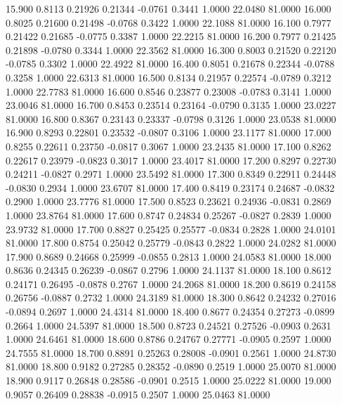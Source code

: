   15.900   0.8113   0.21926   0.21344  -0.0761   0.3441   1.0000  22.0480  81.0000
  16.000   0.8025   0.21600   0.21498  -0.0768   0.3422   1.0000  22.1088  81.0000
  16.100   0.7977   0.21422   0.21685  -0.0775   0.3387   1.0000  22.2215  81.0000
  16.200   0.7977   0.21425   0.21898  -0.0780   0.3344   1.0000  22.3562  81.0000
  16.300   0.8003   0.21520   0.22120  -0.0785   0.3302   1.0000  22.4922  81.0000
  16.400   0.8051   0.21678   0.22344  -0.0788   0.3258   1.0000  22.6313  81.0000
  16.500   0.8134   0.21957   0.22574  -0.0789   0.3212   1.0000  22.7783  81.0000
  16.600   0.8546   0.23877   0.23008  -0.0783   0.3141   1.0000  23.0046  81.0000
  16.700   0.8453   0.23514   0.23164  -0.0790   0.3135   1.0000  23.0227  81.0000
  16.800   0.8367   0.23143   0.23337  -0.0798   0.3126   1.0000  23.0538  81.0000
  16.900   0.8293   0.22801   0.23532  -0.0807   0.3106   1.0000  23.1177  81.0000
  17.000   0.8255   0.22611   0.23750  -0.0817   0.3067   1.0000  23.2435  81.0000
  17.100   0.8262   0.22617   0.23979  -0.0823   0.3017   1.0000  23.4017  81.0000
  17.200   0.8297   0.22730   0.24211  -0.0827   0.2971   1.0000  23.5492  81.0000
  17.300   0.8349   0.22911   0.24448  -0.0830   0.2934   1.0000  23.6707  81.0000
  17.400   0.8419   0.23174   0.24687  -0.0832   0.2900   1.0000  23.7776  81.0000
  17.500   0.8523   0.23621   0.24936  -0.0831   0.2869   1.0000  23.8764  81.0000
  17.600   0.8747   0.24834   0.25267  -0.0827   0.2839   1.0000  23.9732  81.0000
  17.700   0.8827   0.25425   0.25577  -0.0834   0.2828   1.0000  24.0101  81.0000
  17.800   0.8754   0.25042   0.25779  -0.0843   0.2822   1.0000  24.0282  81.0000
  17.900   0.8689   0.24668   0.25999  -0.0855   0.2813   1.0000  24.0583  81.0000
  18.000   0.8636   0.24345   0.26239  -0.0867   0.2796   1.0000  24.1137  81.0000
  18.100   0.8612   0.24171   0.26495  -0.0878   0.2767   1.0000  24.2068  81.0000
  18.200   0.8619   0.24158   0.26756  -0.0887   0.2732   1.0000  24.3189  81.0000
  18.300   0.8642   0.24232   0.27016  -0.0894   0.2697   1.0000  24.4314  81.0000
  18.400   0.8677   0.24354   0.27273  -0.0899   0.2664   1.0000  24.5397  81.0000
  18.500   0.8723   0.24521   0.27526  -0.0903   0.2631   1.0000  24.6461  81.0000
  18.600   0.8786   0.24767   0.27771  -0.0905   0.2597   1.0000  24.7555  81.0000
  18.700   0.8891   0.25263   0.28008  -0.0901   0.2561   1.0000  24.8730  81.0000
  18.800   0.9182   0.27285   0.28352  -0.0890   0.2519   1.0000  25.0070  81.0000
  18.900   0.9117   0.26848   0.28586  -0.0901   0.2515   1.0000  25.0222  81.0000
  19.000   0.9057   0.26409   0.28838  -0.0915   0.2507   1.0000  25.0463  81.0000
